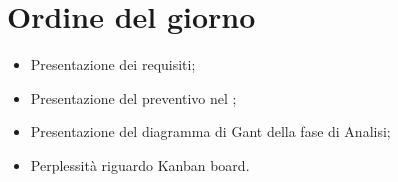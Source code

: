 \section{Ordine del giorno}
\begin{itemize}
\item Presentazione dei requisiti;
\item Presentazione del preventivo nel \PdP{};
\item Presentazione del diagramma di Gant della fase di Analisi;
\item Perplessità riguardo Kanban board.
\end{itemize}
